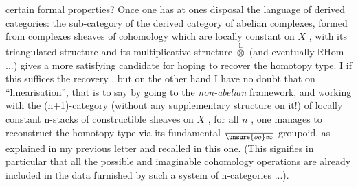 
certain formal properties?\hand{)} Once one has at ones disposal the language of
derived categories: the sub-category of the derived category of abelian
complexes, formed from complexes  sheaves of cohomology which are locally
constant on $X$ , with its triangulated structure and its multiplicative
structure $\overset{\mathbb{L}}{\otimes}$ (and eventually $\mathbb{R}\mathrm{Hom}$ ...) gives a more satisfying candidate
for hoping to recover the homotopy type. I  if this suffices
  the recovery , but on the other hand I have no doubt
that on  ``linearisation'', that is to say by
going to the \emph{non-abelian} framework, and working with the (n+1)-category
(without any supplementary structure on it!) of locally constant n-stacks
of constructible sheaves on $X$ , for all $n$ , one manages to reconstruct
the homotopy type via its fundamental $\over{\unsure{oo}}{\infty}$-groupoid, as explained in my previous
letter and recalled in this one. (This signifies in particular that all
the possible and imaginable cohomology operations are already included in
the data furnished by such a system of n-categories ...).

